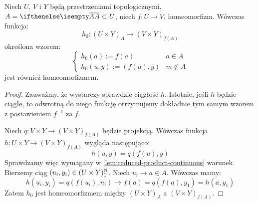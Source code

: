 \begin{lem} \label{lem:reduced-product-homeo}
  Niech $U$, $V$ i $Y$ będą przestrzeniami topologicznymi, $A = \cl A \subset U$, niech  $f: U \to V$, homeomorfizm. Wówczas funkcja:
  \[
    h_0: (U \times Y)_A \to (V \times Y)_{f(A)}
  \]
  określona wzorem:
  \[
    \begin{cases}
      h_0(a) := f(a)& a\in A \\
      h_0(u,y) := (f(u), y)& m\not\in A
    \end{cases}
  \]
  jest również homeomorfizmem.
  \begin{proof}
    Zauważmy, że wystarczy sprawdzić ciągłość $h$. Istotnie, jeśli $h$ będzie ciągłe, to odwrotną do niego funkcję otrzymujemy dokładnie tym samym wzorem z postawieniem $f^{-1}$ za $f$.

    Niech $q: V\times Y \to (V\times Y)_{f(A)}$ będzie projekcją. Wówczas funkcja $h: U\times Y \to (V\times Y)_{f(A)}$ wygląda następująco:
    \[
      h(u,y) = q(f(u),y)
    \]
    Sprawdzamy więc wymagany w \ref{lem:reduced-product-continuous} warunek. Bierzemy ciąg $(u_i, y_i) \in (U\times Y)^\mathbb{N}_1$. Niech $u_i \to a \in A$. Wówczas mamy:
    \[
      h(u_i,y_i) = q(f(u_i), n_i) \to f(a) = q(f(a),y_1) = h(a,y_1)
    \]
    Zatem $h_0$ jest homeomorfizmem między $(U \times Y)_A$ a $(V \times Y)_{f(A)}$.
  \end{proof}
\end{lem}
